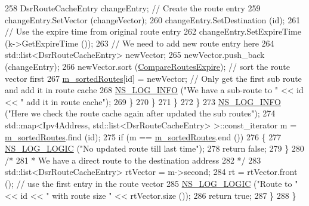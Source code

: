 \begin{DoxyCode}
258                       DsrRouteCacheEntry changeEntry; \textcolor{comment}{// Create the route entry}
259                       changeEntry.SetVector (changeVector);
260                       changeEntry.SetDestination (\textcolor{keywordtype}{id});
261                       \textcolor{comment}{// Use the expire time from original route entry}
262                       changeEntry.SetExpireTime (k->GetExpireTime ());
263                       \textcolor{comment}{// We need to add new route entry here}
264                       std::list<DsrRouteCacheEntry> newVector;
265                       newVector.push\_back (changeEntry);
266                       newVector.sort (\hyperlink{namespacens3_1_1dsr_a53bce2b069de9151de0203d96468684e}{CompareRoutesExpire});  \textcolor{comment}{// sort the route vector
       first}
267                       \hyperlink{classns3_1_1dsr_1_1DsrRouteCache_a8d3530713c7152dbe42d0b616d9c1d96}{m\_sortedRoutes}[id] = newVector;   \textcolor{comment}{// Only get the first sub route and
       add it in route cache}
268                       \hyperlink{group__logging_gafbd73ee2cf9f26b319f49086d8e860fb}{NS\_LOG\_INFO} (\textcolor{stringliteral}{"We have a sub-route to "} << \textcolor{keywordtype}{id} << \textcolor{stringliteral}{" add it in route cache"});
269                     \}
270                 \}
271             \}
272         \}
273       \hyperlink{group__logging_gafbd73ee2cf9f26b319f49086d8e860fb}{NS\_LOG\_INFO} (\textcolor{stringliteral}{"Here we check the route cache again after updated the sub routes"});
274       std::map<Ipv4Address, std::list<DsrRouteCacheEntry> >::const\_iterator m = 
      \hyperlink{classns3_1_1dsr_1_1DsrRouteCache_a8d3530713c7152dbe42d0b616d9c1d96}{m\_sortedRoutes}.find (\textcolor{keywordtype}{id});
275       \textcolor{keywordflow}{if} (m == \hyperlink{classns3_1_1dsr_1_1DsrRouteCache_a8d3530713c7152dbe42d0b616d9c1d96}{m\_sortedRoutes}.end ())
276         \{
277           \hyperlink{group__logging_ga88acd260151caf2db9c0fc84997f45ce}{NS\_LOG\_LOGIC} (\textcolor{stringliteral}{"No updated route till last time"});
278           \textcolor{keywordflow}{return} \textcolor{keyword}{false};
279         \}
280       \textcolor{comment}{/*}
281 \textcolor{comment}{       * We have a direct route to the destination address}
282 \textcolor{comment}{       */}
283       std::list<DsrRouteCacheEntry> rtVector = m->second;
284       rt = rtVector.front ();  \textcolor{comment}{// use the first entry in the route vector}
285       \hyperlink{group__logging_ga88acd260151caf2db9c0fc84997f45ce}{NS\_LOG\_LOGIC} (\textcolor{stringliteral}{"Route to "} << \textcolor{keywordtype}{id} << \textcolor{stringliteral}{" with route size "} << rtVector.size ());
286       \textcolor{keywordflow}{return} \textcolor{keyword}{true};
287     \}
288 \}
\end{DoxyCode}


